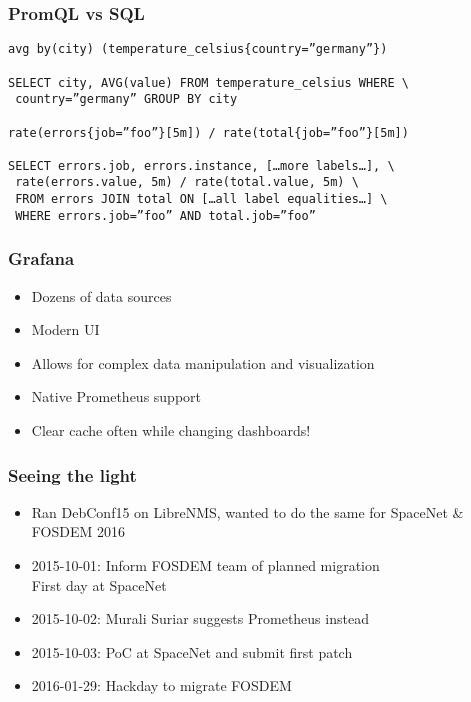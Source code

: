 \documentclass[t]{beamer}
\begin{document}
\begin{frame}[fragile]
	\frametitle{PromQL vs SQL}
	\fontsize{10pt}{12}\selectfont
	\begin{verbatim}
avg by(city) (temperature_celsius{country=”germany”})

SELECT city, AVG(value) FROM temperature_celsius WHERE \
 country=”germany” GROUP BY city

rate(errors{job=”foo”}[5m]) / rate(total{job=”foo”}[5m])

SELECT errors.job, errors.instance, […more labels…], \
 rate(errors.value, 5m) / rate(total.value, 5m) \
 FROM errors JOIN total ON […all label equalities…] \
 WHERE errors.job=”foo” AND total.job=”foo”
	\end{verbatim}
\end{frame}

\begin{frame}
	\frametitle{Grafana}
	\begin{itemize}
		\item Dozens of data sources
		\item Modern UI
		\item Allows for complex data manipulation and visualization
		\item Native Prometheus support
		\item Clear cache often while changing dashboards!
	\end{itemize}
\end{frame}


\begin{frame}
	\frametitle{Seeing the light}
	\begin{itemize}
		\item Ran DebConf15 on LibreNMS, wanted to do the same for SpaceNet \& FOSDEM 2016
		\item 2015-10-01: Inform FOSDEM team of planned migration \\
			\qquad \qquad First day at SpaceNet
		\item 2015-10-02: Murali Suriar suggests Prometheus instead
		\item 2015-10-03: PoC at SpaceNet and submit first patch
		\item 2016-01-29: Hackday to migrate FOSDEM
	\end{itemize}
\end{frame}
\end{document}

